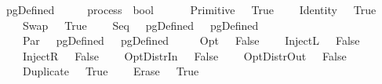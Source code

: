 \isamarkupfalse%
\ pgDefined\ {\isacharcolon}{\isacharcolon}\ {\isachardoublequoteopen}{\isacharparenleft}\ \ \ \ process\ {\isasymRightarrow}\ bool{\isachardoublequoteclose}\ \isanewline
\ \ \ \ {\isachardoublequoteopen}\ {\isacharparenleft}Primitive\ \ {\isacharequal}\ True{\isachardoublequoteclose}\isanewline
\ \ {\isacharbar}\ {\isachardoublequoteopen}\ {\isacharparenleft}Identity\ \ {\isacharequal}\ True{\isachardoublequoteclose}\isanewline
\ \ {\isacharbar}\ {\isachardoublequoteopen}\ {\isacharparenleft}Swap\ \ {\isacharequal}\ True{\isachardoublequoteclose}\isanewline
\ \ {\isacharbar}\ {\isachardoublequoteopen}\ {\isacharparenleft}Seq\ \ {\isacharequal}\ {\isacharparenleft}pgDefined\ \ {\isasymand}\ pgDefined\ \isanewline
\ \ {\isacharbar}\ {\isachardoublequoteopen}\ {\isacharparenleft}Par\ \ {\isacharequal}\ {\isacharparenleft}pgDefined\ \ {\isasymand}\ pgDefined\ \isanewline
\ \ {\isacharbar}\ {\isachardoublequoteopen}\ {\isacharparenleft}Opt\ \ {\isacharequal}\ False{\isachardoublequoteclose}\isanewline
\ \ {\isacharbar}\ {\isachardoublequoteopen}\ {\isacharparenleft}InjectL\ \ {\isacharequal}\ False{\isachardoublequoteclose}\isanewline
\ \ {\isacharbar}\ {\isachardoublequoteopen}\ {\isacharparenleft}InjectR\ \ {\isacharequal}\ False{\isachardoublequoteclose}\isanewline
\ \ {\isacharbar}\ {\isachardoublequoteopen}\ {\isacharparenleft}OptDistrIn\ \ {\isacharequal}\ False{\isachardoublequoteclose}\isanewline
\ \ {\isacharbar}\ {\isachardoublequoteopen}\ {\isacharparenleft}OptDistrOut\ \ {\isacharequal}\ False{\isachardoublequoteclose}\isanewline
\ \ {\isacharbar}\ {\isachardoublequoteopen}\ {\isacharparenleft}Duplicate\ \ {\isacharequal}\ True{\isachardoublequoteclose}\isanewline
\ \ {\isacharbar}\ {\isachardoublequoteopen}\ {\isacharparenleft}Erase\ \ {\isacharequal}\ True{\isachardoublequoteclose}\isanewline
